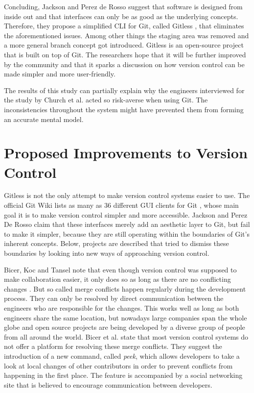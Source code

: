 Concluding, Jackson and Perez de Rosso suggest that software is designed from inside out and that interfaces can only be as good as the underlying concepts. Therefore, they propose a simplified \ac{CLI} for Git, called Gitless \cite{perez_de_rosso_gitless:_????}, that eliminates the aforementioned issues. Among other things the staging area was removed and a more general branch concept got introduced. Gitless is an open-source project that is built on top of Git. The researchers hope that it will be further improved by the community and that it sparks a discussion on how version control can be made simpler and more user-friendly.

The results of this study can partially explain why the engineers interviewed for the study by Church et al. \cite{church_case_2014}
acted so risk-averse when using Git. The inconsistencies throughout the system might have prevented them from forming an accurate mental model.

\section{Proposed Improvements to Version Control}
Gitless is not the only attempt to make version control systems easier to use. The official Git Wiki lists as many as 36 different GUI clients for Git \cite{_interfaces_2015}, whose main goal it is to make version control simpler and more accessible. Jackson and Perez De Rosso claim that these interfaces merely add an aesthetic layer to Git, but fail to make it simpler, because they are still operating within the boundaries of Git's inherent concepts. Below, projects are described that tried to dismiss these boundaries by looking into new ways of approaching version control. 

Bicer, Koc and Tansel note that even though version control was supposed to make collaboration  easier, it only does so as long as there are no conflicting changes \cite{koc_towards_2012}. But so called merge conflicts happen regularly during the development process. They can only be resolved by direct communication between the engineers who are responsible for the changes. This works well as long as both engineers share the same location, but nowadays large companies span the whole globe and open source projects are being developed by a diverse group of people from all around the world. Bicer et al. state that most version control systems do not offer a platform for resolving these merge conflicts. They suggest the introduction of a new command, called \textit{peek}, which allows developers to take a look at local changes of other contributors in order to prevent conflicts from happening in the first place. The feature is accompanied by a social networking site that is believed to encourage communication between developers.

